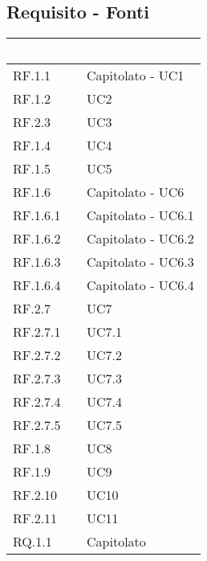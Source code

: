 \subsection{Requisito - Fonti}
\begin{center}
  \centering
  \begin{longtable}{|C{6cm}|C{6cm}|}
    \hline
    \textcolor[HTML]{FFFFFF}{\textbf{Requisito}} & \textcolor[HTML]{FFFFFF}{\textbf{Fonti}} \\ \hline
    RF.1.1 & Capitolato - UC1 \\ \hline
    RF.1.2 & UC2 \\ \hline
    RF.2.3 & UC3 \\ \hline
    RF.1.4 & UC4 \\ \hline
    RF.1.5 & UC5 \\ \hline
    RF.1.6 & Capitolato - UC6 \\ \hline
    RF.1.6.1 & Capitolato - UC6.1 \\ \hline
    RF.1.6.2 & Capitolato - UC6.2 \\ \hline
    RF.1.6.3 & Capitolato - UC6.3 \\ \hline
    RF.1.6.4 & Capitolato - UC6.4 \\ \hline
    RF.2.7 & UC7 \\ \hline
    RF.2.7.1 & UC7.1 \\ \hline
    RF.2.7.2 & UC7.2 \\ \hline
    RF.2.7.3 & UC7.3 \\ \hline
    RF.2.7.4 & UC7.4 \\ \hline
    RF.2.7.5 & UC7.5 \\ \hline
    RF.1.8 & UC8 \\ \hline
    RF.1.9 & UC9 \\ \hline
    RF.2.10 & UC10 \\ \hline
    RF.2.11 & UC11 \\ \hline
    RQ.1.1 & Capitolato \\ \hline

\end{longtable}
\end{center}
